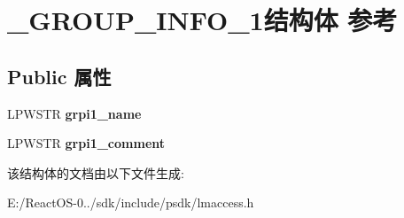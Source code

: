 \hypertarget{struct___g_r_o_u_p___i_n_f_o__1}{}\section{\+\_\+\+G\+R\+O\+U\+P\+\_\+\+I\+N\+F\+O\+\_\+1结构体 参考}
\label{struct___g_r_o_u_p___i_n_f_o__1}
\subsection*{Public 属性}
\begin{DoxyCompactItemize}
\item 
\mbox{\label{struct___g_r_o_u_p___i_n_f_o__1_a64793dae038f62a143d56bc1f0164711}} 
L\+P\+W\+S\+TR {\bfseries grpi1\+\_\+name}
\item 
\mbox{\label{struct___g_r_o_u_p___i_n_f_o__1_a81057281697d9dd6b118aa7aae0e437c}} 
L\+P\+W\+S\+TR {\bfseries grpi1\+\_\+comment}
\end{DoxyCompactItemize}


该结构体的文档由以下文件生成\+:\begin{DoxyCompactItemize}
\item 
E\+:/\+React\+O\+S-\/0../sdk/include/psdk/lmaccess.\+h\end{DoxyCompactItemize}
